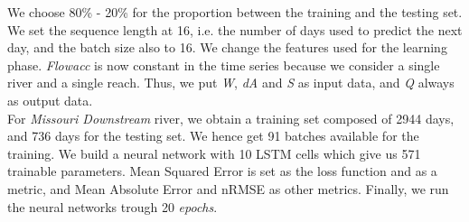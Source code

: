 We choose 80\% - 20\% for the proportion between the training and the testing set. We set the sequence length at 16, i.e. the number of days used to predict the next day, and the batch size also to 16. We change the features used for the learning phase. \textit{Flowacc} is now constant in the time series because we consider a single river and a single reach. Thus, we put \textit{W}, \textit{dA} and \textit{S} as input data, and \textit{Q} always as output data. \\

For \textit{Missouri Downstream} river, we obtain a training set composed of 2944 days, and 736 days for the testing set. We hence get 91 batches available for the training. We build a neural network with 10 LSTM cells which give us 571 trainable parameters. Mean Squared Error is set as the loss function and as a metric, and Mean Absolute Error and nRMSE as other metrics. Finally, we run the neural networks trough 20 \textit{epochs}. 

